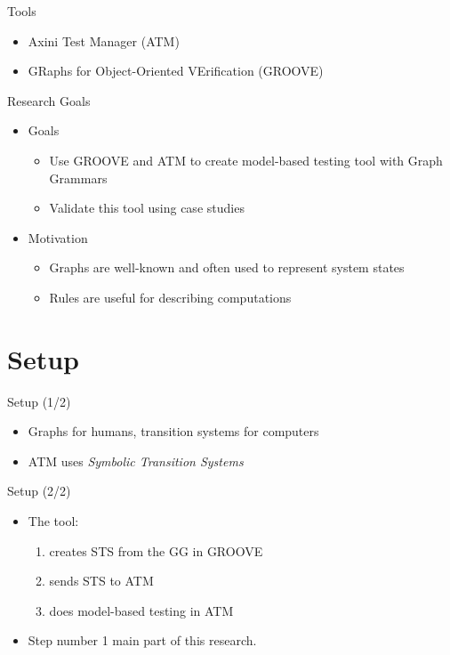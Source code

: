 \documentclass{FMTslides}
\begin{document}
\begin{frame}{Tools}
\begin{itemize}[<+->]
\item Axini Test Manager (ATM)
\item GRaphs for Object-Oriented VErification (GROOVE)
\end{itemize}
\end{frame}

\begin{frame}{Research Goals}
\begin{itemize}[<+->]
  \item Goals
  \begin{itemize}
    \item Use GROOVE and ATM to create model-based testing tool with Graph Grammars
    \item Validate this tool using case studies
  \end{itemize}
  \item Motivation
  \begin{itemize}
    \item Graphs are well-known and often used to represent system states
    \item Rules are useful for describing computations
  \end{itemize}
\end{itemize}
\end{frame}

\makecontentsslide

\section[Setup]{Setup}

\begin{frame}{Setup (1/2)}
\begin{itemize}[<+->]
  \item Graphs for humans, transition systems for computers
  \item ATM uses \textit{Symbolic Transition Systems}
\end{itemize}
\begin{figure}

\end{figure}
\end{frame}

\begin{frame}{Setup (2/2)}
\begin{itemize}[<+->]
  \item The tool:
  \begin{enumerate}
    \item creates STS from the GG in GROOVE
    \item sends STS to ATM
    \item does model-based testing in ATM
  \end{enumerate}
  \item Step number 1 main part of this research.
\end{itemize}
\end{frame}
\end{document}
